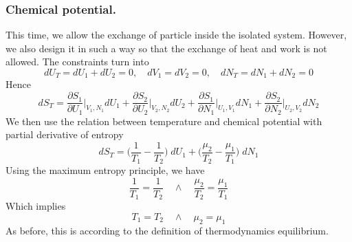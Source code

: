 \documentclass[../../../Main.tex]{subfiles}
\begin{document}
\subsubsection*{Chemical potential.} This time, we allow the exchange of particle inside the isolated system. However, we also design it in such a way so that the exchange of heat and work is not allowed. The constraints turn into 
\begin{equation*}
    dU_T=dU_1+dU_2=0, \quad dV_1 =dV_2=0, \quad dN_T=dN_1+dN_2=0
\end{equation*}
Hence 
\begin{equation*}
    dS_T=\frac{\partial S_1}{\partial U_1}\bigg|_{V_1,N_1} dU_1 + \frac{\partial S_2}{\partial U_2}\bigg|_{V_2,N_2} dU_2  +
    \frac{\partial S_1}{\partial N_1}\bigg|_{U_1,V_1} dN_1 + \frac{\partial S_2}{\partial N_2}\bigg|_{U_2,V_2} dN_2
\end{equation*}
We then use the relation between temperature and chemical potential with partial derivative of entropy
\begin{equation*}
    dS_T=\biggl(\frac{1}{T_1}-\frac{1}{T_2}\biggr)\;dU_1+\biggl(\frac{\mu_2}{T_2}-\frac{\mu_1}{T_1}\biggr)\;dN_1
\end{equation*}
Using the maximum entropy principle, we have 
\begin{equation*}
    \frac{1}{T_1}=\frac{1 }{T_2}
    \quad\land\quad
    \frac{\mu_2}{T_2}=\frac{\mu_1}{T_1}
\end{equation*}
Which implies
\begin{equation*}
    T_1=T_2
    \quad\land\quad
    \mu_2=\mu_1
\end{equation*}
As before, this is according to the definition of thermodynamics equilibrium.
\end{document}
